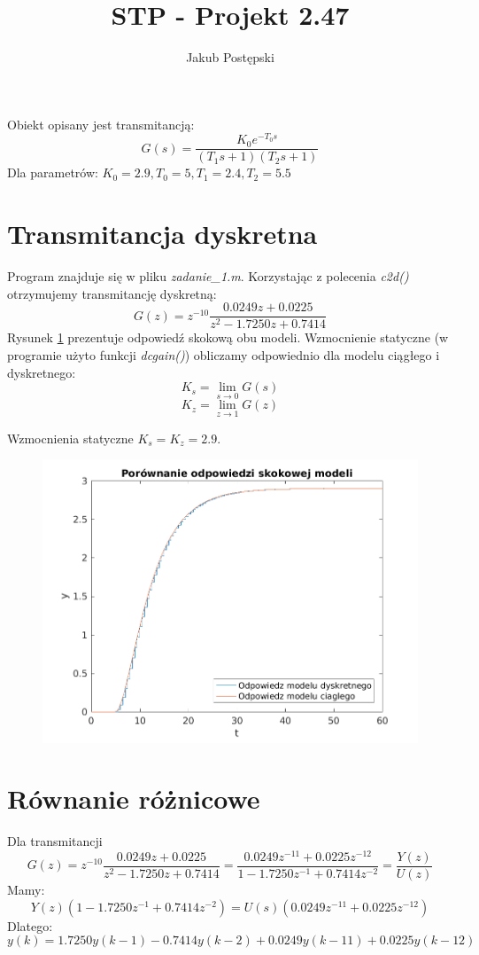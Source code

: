 \documentclass[a4paper, 10pt]{article}
\author{Jakub Postępski}
\title{STP - Projekt 2.47}
\begin{document}
	\maketitle
	Obiekt opisany jest transmitancją:
	\[G(s) = \frac{K_0e^{-T_0s}}{(T_1s+1)(T_2s+1)}\]
	Dla parametrów: $K_0=2.9, T_0=5, T_1=2.4, T_2=5.5$
	\section{Transmitancja dyskretna}
	Program znajduje się w pliku \textit{zadanie\_1.m}.
	Korzystając z polecenia \textit{c2d()} otrzymujemy transmitancję dyskretną:
	\[G(z)=z^{-10}\frac{0.0249z + 0.0225}{z^2 -1.7250z +0.7414}\]
	Rysunek \ref{fig:z1skok} prezentuje odpowiedź skokową obu modeli.
	Wzmocnienie statyczne (w programie użyto funkcji \textit{dcgain()}) obliczamy odpowiednio dla modelu ciągłego i dyskretnego:
	\[K_s = \lim\limits_{s\rightarrow 0}G(s)\] 
	\[K_z = \lim\limits_{z\rightarrow 1}G(z)\]
	
	Wzmocnienia statyczne $K_s=K_z=2.9$.
	
	\begin{figure}
		\centering
		\includegraphics[width=0.7\linewidth]{z1_skok}
		\caption{}
		\label{fig:z1skok}
	\end{figure}
	
	\section{Równanie różnicowe}
	Dla transmitancji \[G(z)=z^{-10}\frac{0.0249z + 0.0225}{z^2 -1.7250z +0.7414} =\frac{0.0249z^{-11} + 0.0225z^{-12}}{1 -1.7250z^{-1} +0.7414z^{-2}}=\frac{Y(z)}{U(z)}\]
	Mamy:
	\[Y(z)(1 -1.7250z^{-1} +0.7414z^{-2}) = U(s)(0.0249z^{-11} + 0.0225z^{-12})\]
	Dlatego:
	\[y(k) = 1.7250y(k-1) - 0.7414y(k-2) + 0.0249y(k-11) + 0.0225y(k-12)\]
\end{document}
